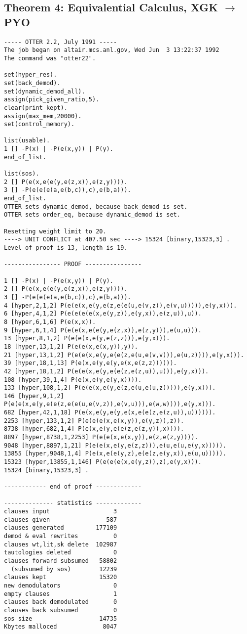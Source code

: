 \subsection{Theorem 4: Equivalential Calculus, XGK $\rightarrow$ PYO}
{\small \begin{verbatim}
----- OTTER 2.2, July 1991 -----
The job began on altair.mcs.anl.gov, Wed Jun  3 13:22:37 1992
The command was "otter22".

set(hyper_res).
set(back_demod).
set(dynamic_demod_all).
assign(pick_given_ratio,5).
clear(print_kept).
assign(max_mem,20000).
set(control_memory).

list(usable).
1 [] -P(x) | -P(e(x,y)) | P(y).
end_of_list.

list(sos).
2 [] P(e(x,e(e(y,e(z,x)),e(z,y)))).
3 [] -P(e(e(e(a,e(b,c)),c),e(b,a))).
end_of_list.
OTTER sets dynamic_demod, because back_demod is set.
OTTER sets order_eq, because dynamic_demod is set.

Resetting weight limit to 20.
----> UNIT CONFLICT at 407.50 sec ----> 15324 [binary,15323,3] .
Level of proof is 13, length is 19.

---------------- PROOF ----------------

1 [] -P(x) | -P(e(x,y)) | P(y).
2 [] P(e(x,e(e(y,e(z,x)),e(z,y)))).
3 [] -P(e(e(e(a,e(b,c)),c),e(b,a))).
4 [hyper,2,1,2] P(e(e(x,e(y,e(z,e(e(u,e(v,z)),e(v,u))))),e(y,x))).
6 [hyper,4,1,2] P(e(e(e(e(x,e(y,z)),e(y,x)),e(z,u)),u)).
8 [hyper,6,1,6] P(e(x,x)).
9 [hyper,6,1,4] P(e(e(x,e(e(y,e(z,x)),e(z,y))),e(u,u))).
13 [hyper,8,1,2] P(e(e(x,e(y,e(z,z))),e(y,x))).
18 [hyper,13,1,2] P(e(e(x,e(x,y)),y)).
21 [hyper,13,1,2] P(e(e(x,e(y,e(e(z,e(u,e(v,v))),e(u,z)))),e(y,x))).
39 [hyper,18,1,13] P(e(x,e(y,e(y,e(x,e(z,z)))))).
42 [hyper,18,1,2] P(e(e(x,e(y,e(e(z,e(z,u)),u))),e(y,x))).
108 [hyper,39,1,4] P(e(x,e(y,e(y,x)))).
133 [hyper,108,1,2] P(e(e(x,e(y,e(z,e(u,e(u,z))))),e(y,x))).
146 [hyper,9,1,2] P(e(e(x,e(y,e(e(z,e(e(u,e(v,z)),e(v,u))),e(w,w)))),e(y,x))).
682 [hyper,42,1,18] P(e(x,e(y,e(y,e(x,e(e(z,e(z,u)),u)))))).
2253 [hyper,133,1,2] P(e(e(e(x,e(x,y)),e(y,z)),z)).
8738 [hyper,682,1,4] P(e(x,e(y,e(e(z,e(z,y)),x)))).
8897 [hyper,8738,1,2253] P(e(e(x,e(x,y)),e(z,e(z,y)))).
9048 [hyper,8897,1,21] P(e(e(x,e(y,e(z,z))),e(u,e(u,e(y,x))))).
13855 [hyper,9048,1,4] P(e(x,e(e(y,z),e(e(z,e(y,x)),e(u,u))))).
15323 [hyper,13855,1,146] P(e(e(e(x,e(y,z)),z),e(y,x))).
15324 [binary,15323,3] .

------------ end of proof -------------

-------------- statistics -------------
clauses input                  3
clauses given                587
clauses generated         177109
demod & eval rewrites          0
clauses wt,lit,sk delete  102987
tautologies deleted            0
clauses forward subsumed   58802
  (subsumed by sos)        12239
clauses kept               15320
new demodulators               0
empty clauses                  1
clauses back demodulated       0
clauses back subsumed          0
sos size                   14735
Kbytes malloced             8047


\end{verbatim}}
